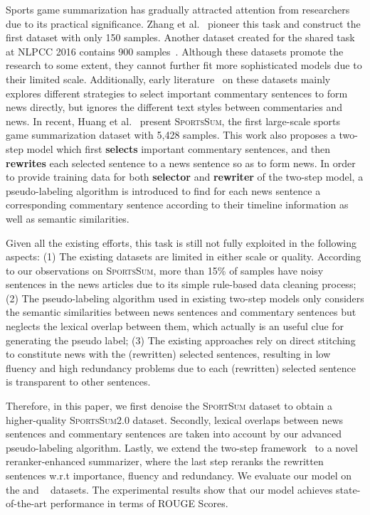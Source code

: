 Sports game summarization has gradually attracted attention from researchers due to its practical significance.
Zhang et al.~\cite{zhang-etal-2016-towards} pioneer this task and construct the first dataset with only 150 samples. Another dataset created for the shared task at NLPCC 2016 contains 900 samples~\cite{Wan2016OverviewOT}. Although these datasets promote the research to some extent, they cannot further fit more sophisticated models due to their limited scale.
Additionally, early literature~\cite{zhang-etal-2016-towards,Zhu2016ResearchOS,Yao2017ContentSF,Liu2016SportsNG} on these datasets mainly explores different strategies to select important commentary sentences to form news directly, but ignores the different text styles between commentaries and news.
In recent, Huang et al.~\cite{Huang2020GeneratingSN} present \textsc{SportsSum}, the first large-scale sports game summarization dataset with 5,428 samples. This work also proposes a two-step model which first \textbf{selects} important commentary sentences, and then \textbf{rewrites} each selected sentence to a news sentence so as to form news.
In order to provide training data for both \textbf{selector} and \textbf{rewriter} of the two-step model, a pseudo-labeling algorithm is introduced to find for each news sentence a corresponding commentary sentence according to their timeline information as well as semantic similarities.

Given all the existing efforts, this task is still not fully exploited in the following aspects:
(1) The existing datasets are limited in either scale or quality. According to our observations on \textsc{SportsSum}, more than 15\% of samples have noisy sentences in the news articles due to its simple rule-based data cleaning process;
(2) The pseudo-labeling algorithm used in existing two-step models only considers the semantic similarities between news sentences and commentary sentences but neglects the lexical overlap between them, which actually is an useful clue for generating the pseudo label;
(3) The existing approaches rely on direct stitching to constitute news with the (rewritten) selected sentences, resulting in low fluency and high redundancy problems due to each (rewritten) selected sentence is transparent to other sentences. 

Therefore, in this paper, we first denoise the \textsc{SportSum} dataset to obtain a higher-quality \textsc{SportsSum2.0} dataset.
Secondly, lexical overlaps between news sentences and commentary sentences are taken into account by our advanced pseudo-labeling algorithm.
Lastly, we extend the two-step framework~\cite{Huang2020GeneratingSN} to a novel reranker-enhanced summarizer, where the last step reranks the rewritten sentences w.r.t importance, fluency and redundancy.
We evaluate our model on the \dataset and \sports~\cite{Huang2020GeneratingSN} datasets. The experimental results show that our model achieves state-of-the-art performance in terms of ROUGE Scores. 

